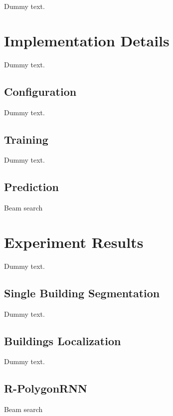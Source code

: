 Dummy text.

\section{Implementation Details}

Dummy text.

\subsection{Configuration}

Dummy text.

\subsection{Training}

Dummy text.

\subsection{Prediction}

Beam search

\section{Experiment Results}

Dummy text.

\subsection{Single Building Segmentation}

Dummy text.

\subsection{Buildings Localization}

Dummy text.

\subsection{R-PolygonRNN}

Beam search
